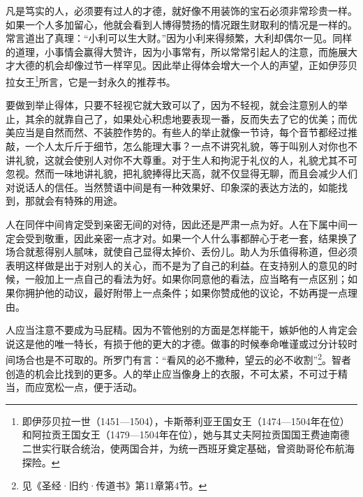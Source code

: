 \par 凡是笃实的人，必须要有过人的才德，就好像不用装饰的宝石必须非常珍贵一样。如果一个人多加留心，他就会看到人博得赞扬的情况跟生财取利的情况是一样的。常言道出了真理：“小利可以生大财。”因为小利来得频繁，大利却偶尔一见。同样的道理，小事情会赢得大赞许，因为小事常有，所以常常引起人的注意，而施展大才大德的机会却像过节一样罕见。因此举止得体会增大一个人的声望，正如伊莎贝拉女王\footnote{即伊莎贝拉一世（1451—1504），卡斯蒂利亚王国女王（1474—1504年在位）和阿拉贡王国女王（1479—1504年在位），她与其丈夫阿拉贡国国王费迪南德二世实行联合统治，使两国合并，为统一西班牙奠定基础，曾资助哥伦布航海探险。}所言，它是一封永久的推荐书。
\par 要做到举止得体，只要不轻视它就大致可以了，因为不轻视，就会注意别人的举止，其余的就靠自己了，如果处心积虑地要表现一番，反而失去了它的优美；而优美应当是自然而然、不装腔作势的。有些人的举止就像一节诗，每个音节都经过推敲，一个人太斤斤于细节，怎么能理大事？一点不讲究礼貌，等于叫别人对你也不讲礼貌，这就会使别人对你不大尊重。对于生人和拘泥于礼仪的人，礼貌尤其不可忽视。然而一味地讲礼貌，把礼貌捧得比天高，就不仅显得无聊，而且会减少人们对说话人的信任。当然赞语中间是有一种效果好、印象深的表达方法的，如能找到，那就会有特殊的用途。
\par 人在同伴中间肯定受到亲密无间的对待，因此还是严肃一点为好。人在下属中间一定会受到敬重，因此亲密一点才对。如果一个人什么事都醉心于老一套，结果换了场合就惹得别人腻味，就使自己显得太掉价、丢份儿。助人为乐值得称道，但必须表明这样做是出于对别人的关心，而不是为了自己的利益。在支持别人的意见的时候，一般加上一点自己的看法为好。如果你同意他的看法，应当略有一点区别；如果你拥护他的动议，最好附带上一点条件；如果你赞成他的议论，不妨再提一点理由。
\par 人应当注意不要成为马屁精。因为不管他别的方面是怎样能干，嫉妒他的人肯定会说这是他的唯一特长，有损于他的更大的才德。做事的时候奉命唯谨或过分计较时间场合也是不可取的。所罗门有言：“看风的必不撒种，望云的必不收割”\footnote{见《圣经·旧约·传道书》第11章第4节。}。智者创造的机会比找到的更多。人的举止应当像身上的衣服，不可太紧，不可过于精当，而应宽松一点，便于活动。



